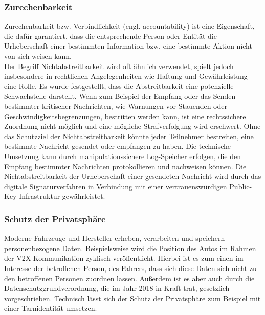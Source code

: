\subsubsection{Zurechenbarkeit}
\glqq Zurechenbarkeit bzw. Verbindlichkeit (engl. accountability) ist eine Eigenschaft, die dafür garantiert, dass die entsprechende Person oder Entität die Urheberschaft einer bestimmten Information bzw. eine bestimmte Aktion nicht von sich weisen kann.
\grqq{} \cite[8]{Wurm.2022} \\
Der Begriff Nichtabstreitbarkeit wird oft ähnlich verwendet, spielt jedoch insbesondere in rechtlichen Angelegenheiten wie Haftung und Gewährleistung eine Rolle. Es wurde festgestellt, dass die Abstreitbarkeit eine potenzielle Schwachstelle darstellt. Wenn zum Beispiel der Empfang oder das Senden bestimmter kritischer Nachrichten, wie Warnungen vor Stauenden oder Geschwindigkeitsbegrenzungen, bestritten werden kann, ist eine rechtssichere Zuordnung nicht möglich und eine mögliche Strafverfolgung wird erschwert. Ohne das Schutzziel der Nichtabstreitbarkeit könnte jeder Teilnehmer bestreiten, eine bestimmte Nachricht gesendet oder empfangen zu haben. Die technische Umsetzung kann durch manipulationssichere Log-Speicher erfolgen, die den Empfang bestimmter Nachrichten protokollieren und nachweisen können. Die Nichtabstreitbarkeit der Urheberschaft einer gesendeten Nachricht wird durch das digitale Signaturverfahren in Verbindung mit einer vertrauenswürdigen Public-Key-Infrastruktur gewährleistet. \cite[8]{Wurm.2022}

\subsubsection{Schutz der Privatsphäre}
Moderne Fahrzeuge und Hersteller erheben, verarbeiten und speichern personenbezogene Daten. Beispielsweise wird die Position des Autos im Rahmen der \ac{V2X}-Kommunikation zyklisch veröffentlicht. Hierbei ist es zum einen im Interesse der betroffenen Person, des Fahrers, dass sich diese Daten sich nicht zu den betroffenen Personen zuordnen lassen. Außerdem ist es aber auch durch die Datenschutzgrundverordnung, die im Jahr 2018 in Kraft trat, gesetzlich vorgeschrieben. Technisch lässt sich der Schutz der Privatsphäre zum Beispiel mit einer Tarnidentität umsetzen.


